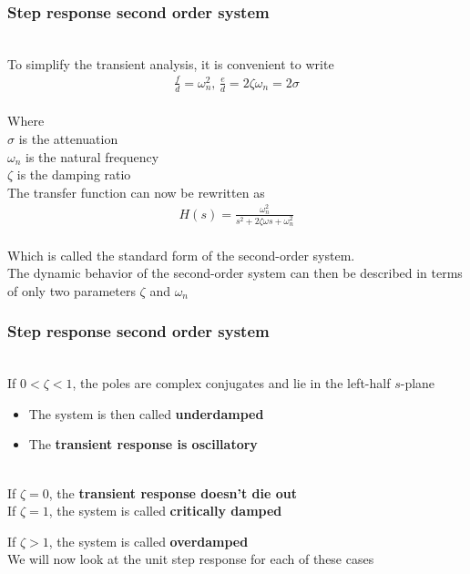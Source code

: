 \begin{frame}
\frametitle{Step response second order system}

\\ To simplify the transient analysis, it is convenient to write
\\ 
\begin{align*}
\frac{f}{d} = \omega_n ^2\text{, } \frac{e}{d}=2\zeta\omega_n=2\sigma
\end{align*}
\\ Where 
\\ $\sigma$ is the attenuation 
\\$\omega_n$ is the natural frequency 
\\ $\zeta$ is the damping ratio
\vspace{0.25cm}
\pause
\\ The transfer function can now be rewritten as
\\ \vspace{-0.5cm}
\begin{align*}
H(s) = \frac{\omega_n ^2}{s^2+2\zeta\omega s +\omega_n ^2}
\end{align*}
\\ Which is called the standard form of the second-order system.
\vspace{0.25cm}
\pause
\\ The dynamic behavior of the second-order system can then be described in terms of only two parameters $\zeta$ and $\omega_n$ 
\end{frame}

\begin{frame}
\frametitle{Step response second order system}
\\If $0<\zeta<1$, the poles are complex conjugates and lie in the left-half $s$-plane
\begin{itemize}
\item The system is then called \textbf{underdamped}
\vspace{0.15cm}
\item The \textbf{transient response is oscillatory}
\end{itemize}
\vspace{0.35cm}
\pause
\\ If $\zeta=0$, the \textbf{transient response doesn't die out}
\vspace{0.35cm}
\pause
\\ If $\zeta=1$, the system is called \textbf{critically damped}
\vspace{0.35cm}
\pause
\item If $\zeta>1$, the system is called \textbf{overdamped}
\vspace{0.35cm}
\\ We will now look at the unit step response for each of these cases
\end{frame}

